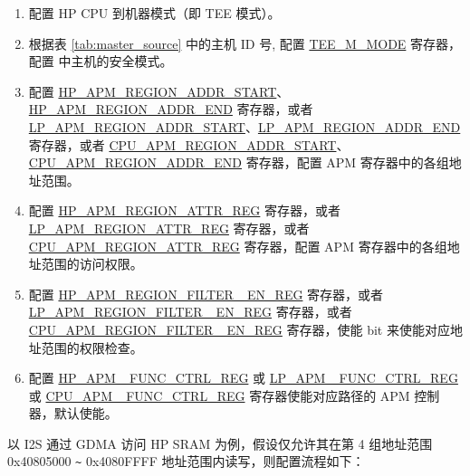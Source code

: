 \documentclass[main\_\_CN.tex]{subfiles}
\begin{document}
\begin{enumerate}

    \item 配置 HP CPU 到机器模式（即 TEE 模式）。

    \item 根据表 \ref{tab:master_source} 中的主机 ID 号, 配置 \hyperref[fielddesc:TEEMNMODE]{TEE\_M\_MODE} 寄存器，配置 \chipname{} 中主机的安全模式。

    \item 配置 \hyperref[regdesc:HPAPMREGIONNADDRSTARTREG]{HP\_APM\_REGION\_ADDR\_START}、\hyperref[regdesc:HPAPMREGIONNADDRENDREG]{HP\_APM\_REGION\_ADDR\_END} 寄存器，或者 \hyperref[regdesc:LPAPMREGIONNADDRSTARTREG]{LP\_APM\_REGION\_ADDR\_START}、\hyperref[regdesc:LPAPMREGIONNADDRENDREG]{LP\_APM\_REGION\_ADDR\_END} 寄存器，或者 \hyperref[regdesc:CPUAPMREGIONNADDRSTARTREG]{CPU\_APM\_REGION\_ADDR\_START}、\hyperref[regdesc:CPUAPMREGIONNADDRENDREG]{CPU\_APM\_REGION\_ADDR\_END} 寄存器，配置 APM 寄存器中的各组地址范围。

    \item 配置 \hyperref[regdesc:HPAPMREGIONNATTRREG]{HP\_APM\_REGION\_ATTR\_REG} 寄存器，或者 \hyperref[regdesc:LPAPMREGIONNATTRREG]{LP\_APM\_REGION\_ATTR\_REG} 寄存器，或者 \hyperref[regdesc:CPUAPMREGIONNATTRREG]{CPU\_APM\_REGION\_ATTR\_REG} 寄存器，配置 APM 寄存器中的各组地址范围的访问权限。

    \item 配置 \hyperref[fielddesc:HPAPMREGIONFILTEREN]{HP\_APM\_REGION\_FILTER\_ EN\_REG} 寄存器，或者 \hyperref[fielddesc:LPAPMREGIONFILTEREN]{LP\_APM\_REGION\_FILTER\_ EN\_REG} 寄存器，或者 \hyperref[fielddesc:CPUAPMREGIONFILTEREN]{CPU\_APM\_REGION\_FILTER\_ EN\_REG} 寄存器，使能 bit  来使能对应地址范围的权限检查。

    \item 配置 \hyperref[regdesc:HPAPMFUNCCTRLREG]{HP\_APM\_ FUNC\_CTRL\_REG} 或 \hyperref[regdesc:LPAPMFUNCCTRLREG]{LP\_APM \_FUNC\_CTRL\_REG} 或 \hyperref[regdesc:CPUAPMFUNCCTRLREG]{CPU\_APM \_FUNC\_CTRL\_REG} 寄存器使能对应路径的 APM 控制器，默认使能。
\end{enumerate}

以 I2S 通过 GDMA 访问 HP SRAM 为例，假设仅允许其在第 4 组地址范围 0x40805000 \verb+~+ 0x4080FFFF 地址范围内读写，则配置流程如下：
\end{document}
